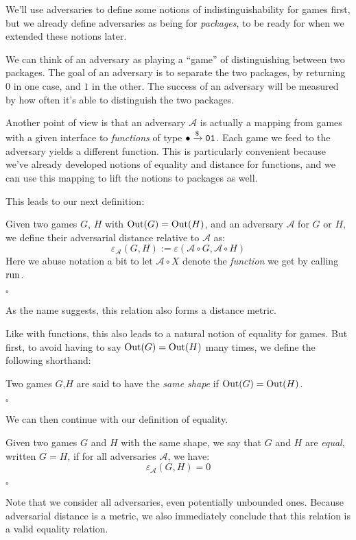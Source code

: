 We'll use adversaries to define some notions of indistinguishability
for games first, but we already define adversaries as being for \emph{packages},
to be ready for when we extended these notions later.

We can think of an adversary as playing a ``game'' of distinguishing
between two packages.
The goal of an adversary is to separate the two packages,
by returning $0$ in one case, and $1$ in the other.
The success of an adversary will be measured by how often it's able
to distinguish the two packages.

Another point of view is that an adversary $\mathcal{A}$ is actually
a mapping from games with a given interface to \emph{functions}
of type $\bullet \xrightarrow{\$} \texttt{01}$.
Each game we feed to the adversary yields a different function.
This is particularly convenient because we've already developed
notions of equality and distance for functions, and we can use
this mapping to lift the notions to packages as well.

This leads to our next definition:
\begin{definition}
    Given two games $G$, $H$ with $\text{Out}(G) = \text{Out}(H)$, and
    an adversary $\mathcal{A}$ for $G$ or $H$, we define their adversarial
    distance relative to $\mathcal{A}$ as:
    $$
    \varepsilon_{\mathcal{A}}(G, H) := \varepsilon(\mathcal{A} \circ G, \mathcal{A} \circ H)
    $$
    Here we abuse notation a bit to let $\mathcal{A} \circ X$ denote the
    \emph{function} we get by calling $\text{run}$.

    $\square$
\end{definition}

As the name suggests, this relation also forms a distance metric.

Like with functions, this also leads to a natural notion of equality
for games. But first, to avoid having to say $\text{Out}(G) = \text{Out}(H)$ many times,
we define the following shorthand:
\begin{definition}
    Two games $G$,$H$ are said to have the \emph{same shape} if
    $\text{Out}(G) = \text{Out}(H)$.

    $\square$
\end{definition}

We can then continue with our definition of equality.

\begin{definition}
    Given two games $G$ and $H$ with the same shape, we say
    that $G$ and $H$ are \emph{equal}, written $G = H$,
    if for all adversaries $\mathcal{A}$, we have:
    $$
    \varepsilon_{\mathcal{A}}(G, H) = 0
    $$

    $\square$
\end{definition}
Note that we consider all adversaries, even potentially unbounded ones.
Because adversarial distance is a metric, we also immediately
conclude that this relation is a valid equality relation.

